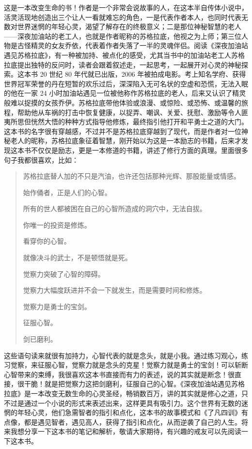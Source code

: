 \begin{book}
    这是一本改变生命的书！作者是一个非常会说故事的人，在这本半自传体小说中，活灵活现地创造出三个让人一看就难忘的角色，一是代表作者本人，也同时代表无数对世界迷惘的年轻心灵，渴望了解存在的终极意义；二是那位神秘智慧的老人——深夜加油站的老工人，也就是作者昵称的苏格拉底，他视之为上师；第三位人物是古怪精灵的女友乔依，代表着作者失落了一半的灵魂伴侣。阅读《深夜加油站遇见苏格拉底》，有一种被加持、被点化的感受，尤其当书中的加油站老工人苏格拉底提出独特的反问时，读者会跟着叙述走，一起思考，一起展开对心灵的神秘探索。这本书 20 世纪 80 年代就已出版，2006 年被拍成电影。考上知名学府、获得世界冠军荣誉的丹在短暂的欢乐过后，深深陷入无可名状的空虚和恐慌，无法入眠的他在一家 24 小时加油站遇见一位被他称作苏格拉底的老人，后来又认识了精灵般难以捉摸的女孩乔伊。苏格拉底带他体验或浪漫、或惊险、或恐怖、或温馨的旅程，帮助他从车祸的打击中恢复健康，以捉弄、嘲讽、关爱、抚慰、激励等令人匪夷所思但恍然大悟的种种方式指导他修炼，最终指引他打开和平勇士之道的大门。这本书的名字很有穿越感，不过并不是苏格拉底穿越到了现代，而是作者对一位神秘老人的昵称，苏格拉底象征着智慧，刚开始以为这是一本励志的书籍，后来才发现这本书不仅仅是励志，更是一本修道的书籍，讲述了修行方面的真理。里面很多句子我都很喜欢，比如：

    \begin{quotation}
        苏格拉底替人加的不只是汽油，也许还包括那种光辉、那股能量或情感。

        始作俑者，正是人们的心智。

        所有的世人都被困在自己的心智所造成的洞穴中，无法自拔。

        你唯一的投资是修炼。

        看穿你的心智。

        就像决斗的武士，不是顿悟就是死。

        觉察力突破了心智的障碍。

        觉察力大幅度跃进并不会一下就发生，而是需要时间和修炼。

        觉察力是勇士的宝剑。

        征服心智。

        剑已磨利。
    \end{quotation}

    这些语句读来就很有加持力，心智代表的就是念头，就是小我。通过练习观心，练习觉察，来征服心智，觉察力就是念头的克星！觉察力就是勇士的宝剑！可以斩断心智带来的束缚，我很喜欢这本书直接而有力的表述，说的其实就是断念！很直接，很干脆！就是把觉察力这把剑磨利，征服自己的心智。《深夜加油站遇见苏格拉底》是一本改变无数生命的心灵圣经，畅销数百万，讲的其实就是修心之道，只不过是通过一个小说的形式来表述出来，这样更具有吸引力。这个世界有无数的迷惘的年轻心灵，他们急需智者的指引和点化，这本书的故事模式和《了凡四训》有点像，都是遇见智者，遇见高人，获得了指引和点化，从而逆袭了自己的人生。将来我想分享一下这本书的笔记和解析，敬请大家期待，有兴趣的戒友可以先阅读一下这本书。
\end{book}
